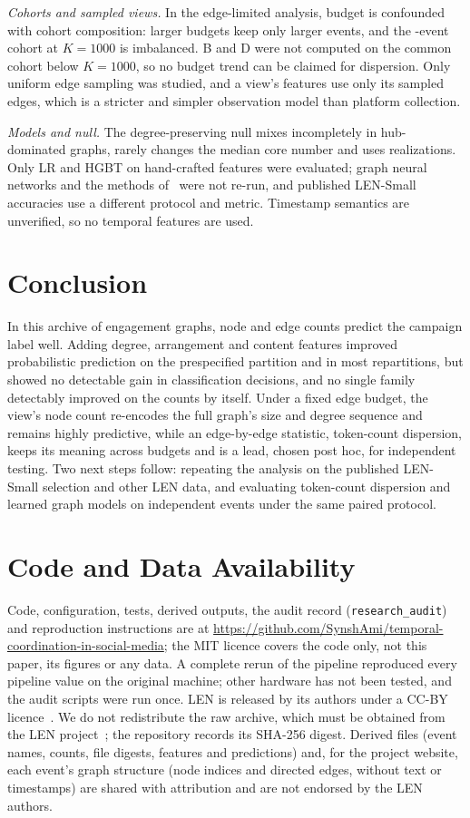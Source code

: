 \documentclass[conference]{IEEEtran}
\begin{document}
\emph{Cohorts and sampled views.} In the edge-limited analysis, budget is confounded with cohort composition: larger budgets keep only larger events, and the \REligThousand-event cohort at $K=1000$ is imbalanced. B and D were not computed on the common cohort below $K=1000$, so no budget trend can be claimed for dispersion. Only uniform edge sampling was studied, and a view's features use only its sampled edges, which is a stricter and simpler observation model than platform collection.

\emph{Models and null.} The degree-preserving null mixes incompletely in hub-dominated graphs, rarely changes the median core number and uses \RRealizations{} realizations. Only LR and HGBT on hand-crafted features were evaluated; graph neural networks and the methods of~\cite{len,decode} were not re-run, and published LEN-Small accuracies use a different protocol and metric. Timestamp semantics are unverified, so no temporal features are used.

\section{Conclusion}\label{sec:conclusion}
In this archive of \RNEvents{} engagement graphs, node and edge counts predict the campaign label well. Adding degree, arrangement and content features improved probabilistic prediction on the prespecified partition and in most repartitions, but showed no detectable gain in classification decisions, and no single family detectably improved on the counts by itself. Under a fixed edge budget, the view's node count re-encodes the full graph's size and degree sequence and remains highly predictive, while an edge-by-edge statistic, token-count dispersion, keeps its meaning across budgets and is a lead, chosen post hoc, for independent testing. Two next steps follow: repeating the analysis on the published LEN-Small selection and other LEN data, and evaluating token-count dispersion and learned graph models on independent events under the same paired protocol.

\section*{Code and Data Availability}
Code, configuration, tests, derived outputs, the audit record (\texttt{research\_audit}) and reproduction instructions are at \url{https://github.com/SynshAmi/temporal-coordination-in-social-media}; the MIT licence covers the code only, not this paper, its figures or any data. A complete rerun of the pipeline reproduced every pipeline value on the original machine; other hardware has not been tested, and the audit scripts were run once. LEN is released by its authors under a CC-BY licence~\cite{len}. We do not redistribute the raw archive, which must be obtained from the LEN project~\cite{repo}; the repository records its SHA-256 digest. Derived files (event names, counts, file digests, features and predictions) and, for the project website, each event's graph structure (node indices and directed edges, without text or timestamps) are shared with attribution and are not endorsed by the LEN authors.

\balance


\end{document}
